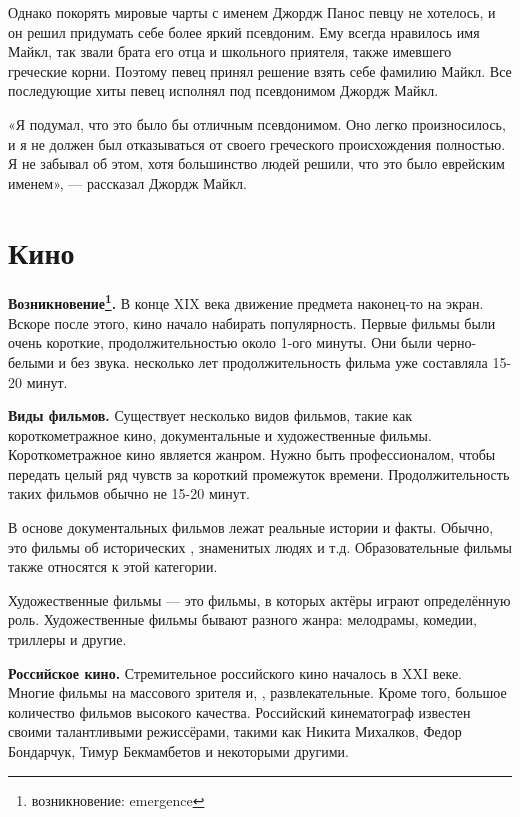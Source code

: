 Однако покорять мировые чарты с именем Джордж Панос певцу не хотелось, и он решил придумать себе более яркий псевдоним. Ему всегда нравилось имя Майкл, так звали брата его отца и школьного приятеля, также имевшего греческие корни. Поэтому певец принял решение взять себе фамилию Майкл. Все последующие хиты певец исполнял под псевдонимом Джордж Майкл.

«Я подумал, что это было бы отличным псевдонимом. Оно легко произносилось, и я не должен был отказываться от своего греческого происхождения полностью. Я не забывал об этом, хотя большинство людей решили, что это было еврейским именем», --- рассказал Джордж Майкл.


\clearpage

\section{Кино}
\textbf{Возникновение\footnote{возникновение: emergence}.}
В конце XIX века движение предмета наконец-то   на экран. Вскоре после этого, кино начало набирать популярность. Первые фильмы были очень короткие, продолжительностью около 1-ого минуты. Они были черно-белыми и без звука.  несколько лет продолжительность фильма уже составляла 15-20 минут.

\textbf{Виды фильмов.}
Существует несколько видов фильмов, такие как короткометражное кино, документальные и художественные фильмы.
Короткометражное кино является  жанром. Нужно быть профессионалом, чтобы передать целый ряд чувств за короткий промежуток времени. Продолжительность таких фильмов обычно не  15-20 минут.

В основе документальных фильмов лежат реальные истории и факты. Обычно, это фильмы об исторических , знаменитых людях и т.д.
Образовательные фильмы также относятся к этой категории.

Художественные фильмы --- это фильмы, в которых актёры играют определённую роль. Художественные фильмы бывают разного жанра: мелодрамы, комедии, триллеры и другие.

\textbf{Российское кино.}
Стремительное  российского кино началось в XXI веке. Многие фильмы  на массового зрителя и, , развлекательные. Кроме того,  большое количество фильмов высокого качества. Российский кинематограф известен своими талантливыми режиссёрами, такими как Никита Михалков, Федор Бондарчук, Тимур Бекмамбетов и некоторыми другими.

